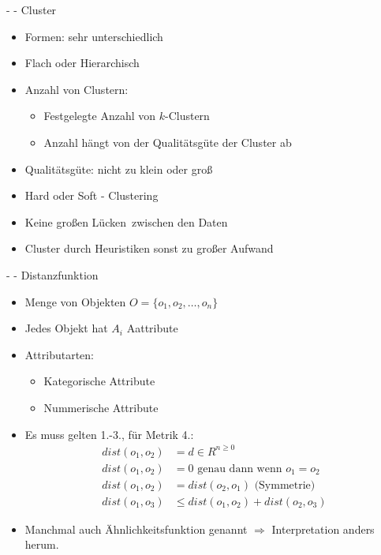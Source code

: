 \documentclass[fleqn,11pt,aspectratio=43]{beamer}
\begin{document}
\begin{frame}{\insertsectionhead - \insertsubsectionhead - Cluster\cite{dwh}}
\begin{itemize}
\item Formen: sehr unterschiedlich
\item Flach oder Hierarchisch
\item Anzahl von Clustern:
\begin{itemize}
\item Festgelegte Anzahl von $k$-Clustern
\item Anzahl hängt von der Qualitätsgüte der Cluster ab
\end{itemize} 
\item Qualitätsgüte: nicht zu klein oder groß
\item Hard oder Soft - Clustering
\item Keine großen \glqq Lücken\grqq\ zwischen den Daten
\item Cluster durch Heuristiken sonst zu großer Aufwand
\end{itemize}
\end{frame}

\begin{frame}{\insertsectionhead - \insertsubsectionhead - Distanzfunktion\cite{ester2000knowledge}}
\begin{itemize}
\item Menge von Objekten $O = \{o_1, o_2, \ldots, o_n\}$
\item Jedes Objekt hat $A_i$ Aattribute
\item Attributarten:
\begin{itemize}
\item Kategorische Attribute
\item Nummerische Attribute
\end{itemize}
\item Es muss gelten 1.-3., für Metrik 4.:
\begin{align}
dist(o_1, o_2) &= d \in R^{n\geq 0}\\
dist(o_1, o_2) &= 0 \mbox{ genau dann wenn } o_1 = o_2\\
dist(o_1, o_2) &= dist(o_2, o_1) \mbox{ (Symmetrie)}\\
dist(o_1, o_3) &\leq dist(o_1, o_2) + dist(o_2, o_3)
\end{align}
\item Manchmal auch Ähnlichkeitsfunktion genannt $\Rightarrow$ Interpretation anders herum.
\end{itemize}
\end{frame}
\end{document}
